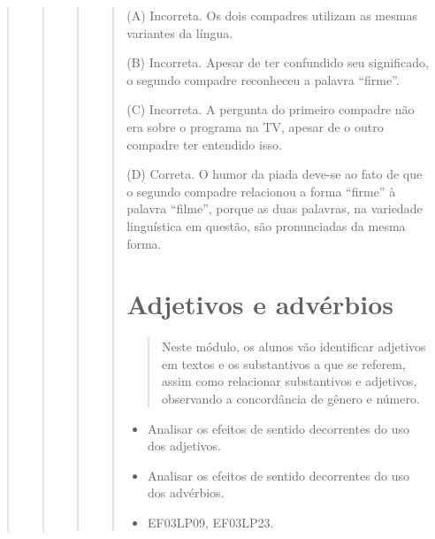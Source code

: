 \begin{boxlist}
{{\begin{quote}
\begin{quote}
\begin{quote}
{\begin{quote}
(A) Incorreta. Os dois compadres utilizam as mesmas variantes da língua.

(B) Incorreta. Apesar de ter confundido seu significado, o segundo compadre reconheceu a palavra ``firme''.

(C) Incorreta. A pergunta do primeiro compadre não era sobre o programa na TV, apesar de o outro compadre ter entendido isso.

(D) Correta. O humor da piada deve-se ao fato de que o segundo compadre relacionou a forma ``firme'' à palavra ``filme'', porque as duas palavras, na variedade linguística em questão, são pronunciadas da mesma forma.

\chapter{Adjetivos e advérbios}

\begin{quote}
Neste módulo, os alunos vão identificar adjetivos em textos e os
substantivos a que se referem, assim como relacionar substantivos e
adjetivos, observando a concordância de gênero e número.
\end{quote}


\begin{itemize}
  \item Analisar os efeitos de sentido decorrentes do uso dos adjetivos.
  \item Analisar os efeitos de sentido decorrentes do uso dos advérbios.
\end{itemize}


\begin{itemize}
  \item EF03LP09, EF03LP23.
\end{itemize}

\end{quote}}
\end{quote}
\end{quote}
\end{quote}}}
\end{boxlist}
